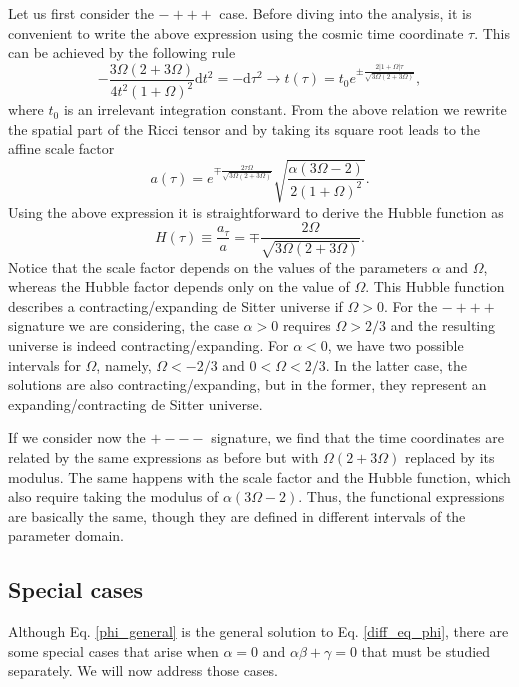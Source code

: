 \documentclass[epj]{svjour}
\begin{document}
Let us first consider the $-+++$  case. Before diving into the analysis, it is convenient to write the above expression using the cosmic time coordinate $\tau$. This can be achieved by the following rule
\begin{equation}
-\frac{3\Omega\left(2 + 3 \Omega\right)}{4t^2 \left(1 + \Omega\right)^2} \mathrm{d}t^2 = - \mathrm{d}\tau^2 \to t(\tau) = t_0e^{\pm\frac{2|1 + \Omega|\tau}{\sqrt{3\Omega(2 + 3\Omega)}} },
\end{equation}
where $t_0$ is an irrelevant integration constant. From the above relation we rewrite the spatial part of the Ricci tensor and by taking its square root leads to the affine scale factor
\begin{equation}
a(\tau) = e^{\mp\frac{2\tau\Omega}{\sqrt{3\Omega(2 + 3\Omega)}}}\sqrt{\frac{\alpha(3\Omega - 2)}{2(1 + \Omega)^2}}.
\end{equation}
Using the above expression it is straightforward to derive the Hubble function as
\begin{equation}
H(\tau)\equiv \frac{a_\tau}{a} = \mp\frac{2\Omega}{\sqrt{3\Omega(2 + 3\Omega)}}.
\end{equation}
Notice that the scale factor depends on the values of the parameters $\alpha$ and $\Omega$, whereas the {Hubble factor} depends only on the value
of $\Omega$. This Hubble function describes a contracting/expanding de Sitter universe if $\Omega>0$.  For the $-+++$  signature we are considering, the case $\alpha>0$ requires $\Omega>2/3$ and the resulting universe is indeed contracting/expanding. For $\alpha<0$, we have two possible intervals for $\Omega$, namely, 
$\Omega<-2/3$ and $0<\Omega<2/3$. In the latter case, the solutions are also contracting/expanding, but in the former, they represent an expanding/contracting de Sitter universe. 

If we consider now the $+---$ signature, we find that the time coordinates are related by the same expressions as before but with $\Omega(2 + 3\Omega)$ replaced by its modulus. The same happens with the scale factor and the Hubble function, which also require taking the modulus of $\alpha(3\Omega - 2)$. Thus, the functional expressions are basically the same, though they are defined in different intervals of the parameter domain. 

\subsection{Special cases}

Although Eq. \eqref{phi_general} is the general solution to Eq. \eqref{diff_eq_phi}, there are some special cases that arise when  $\alpha = 0$ and $\alpha\beta + \gamma = 0$ that must be studied separately. We will now address those cases. 
\end{document}
